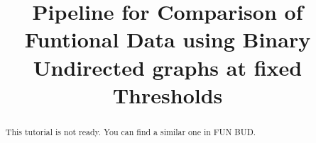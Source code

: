 \documentclass[justified]{tufte-handout}
\title{Pipeline for Comparison of Funtional Data using Binary Undirected graphs at fixed Thresholds}
\begin{document}
\maketitle

\begin{abstract}
\noindent
This tutorial is not ready. You can find a similar one in FUN BUD.
\end{abstract}
\end{document}
